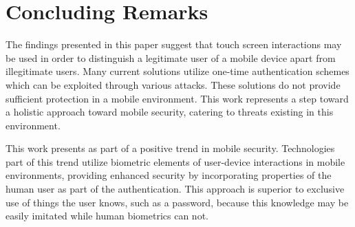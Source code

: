 \section{Concluding Remarks}
The findings presented in this paper suggest that 
touch screen interactions may be used in order to
distinguish a legitimate user of a mobile device apart from
illegitimate users.
%
Many current solutions utilize one-time authentication schemes
which can be exploited through various attacks.
These solutions do not provide sufficient protection in a mobile environment.
This work represents a step toward a
holistic approach toward mobile security,
catering to threats existing in this environment.


This work presents as part of a positive trend in mobile security.
Technologies part of this trend
utilize biometric elements of user-device interactions in mobile environments,
providing enhanced security by
incorporating
properties of the human user as part of the authentication.
This approach is superior to exclusive use of
things the user knows,
such as a password,
because this knowledge may be easily imitated while
human biometrics can not.